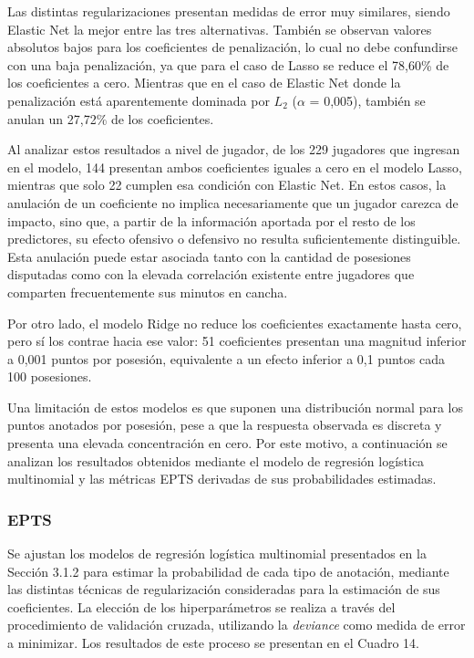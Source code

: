 \documentclass[
  12pt,
]{article}
\begin{document}
Las distintas regularizaciones presentan medidas de error muy similares,
siendo Elastic Net la mejor entre las tres alternativas. También se
observan valores absolutos bajos para los coeficientes de penalización,
lo cual no debe confundirse con una baja penalización, ya que para el
caso de Lasso se reduce el 78,60\% de los coeficientes a cero. Mientras
que en el caso de Elastic Net donde la penalización está aparentemente
dominada por \(L_2\) (\(\alpha\) = 0,005), también se anulan un 27,72\%
de los coeficientes.

Al analizar estos resultados a nivel de jugador, de los 229 jugadores
que ingresan en el modelo, 144 presentan ambos coeficientes iguales a
cero en el modelo Lasso, mientras que solo 22 cumplen esa condición con
Elastic Net. En estos casos, la anulación de un coeficiente no implica
necesariamente que un jugador carezca de impacto, sino que, a partir de
la información aportada por el resto de los predictores, su efecto
ofensivo o defensivo no resulta suficientemente distinguible. Esta
anulación puede estar asociada tanto con la cantidad de posesiones
disputadas como con la elevada correlación existente entre jugadores que
comparten frecuentemente sus minutos en cancha.

Por otro lado, el modelo Ridge no reduce los coeficientes exactamente
hasta cero, pero sí los contrae hacia ese valor: 51 coeficientes
presentan una magnitud inferior a 0,001 puntos por posesión, equivalente
a un efecto inferior a 0,1 puntos cada 100 posesiones.

Una limitación de estos modelos es que suponen una distribución normal
para los puntos anotados por posesión, pese a que la respuesta observada
es discreta y presenta una elevada concentración en cero. Por este
motivo, a continuación se analizan los resultados obtenidos mediante el
modelo de regresión logística multinomial y las métricas EPTS derivadas
de sus probabilidades estimadas.

\subsubsection{EPTS}\label{epts}

Se ajustan los modelos de regresión logística multinomial presentados en
la Sección 3.1.2 para estimar la probabilidad de cada tipo de anotación,
mediante las distintas técnicas de regularización consideradas para la
estimación de sus coeficientes. La elección de los hiperparámetros se
realiza a través del procedimiento de validación cruzada, utilizando la
\emph{deviance} como medida de error a minimizar. Los resultados de este
proceso se presentan en el Cuadro 14.
\end{document}
